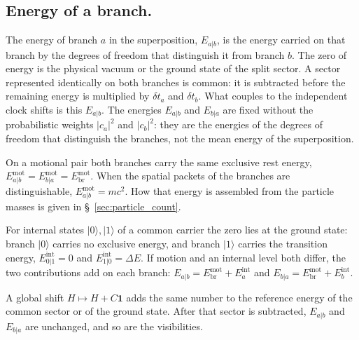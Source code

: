 \documentclass[11pt,a4paper]{article}
\begin{document}
\subsection{Energy of a branch.}
\label{sec:branch_energy}
The energy of branch $a$ in the superposition, $E_{a|b}$, is the energy carried on that branch by the degrees of freedom that distinguish it from branch $b$. The zero of energy is the physical vacuum or the ground state of the split sector. A sector represented identically on both branches is common: it is subtracted before the remaining energy is multiplied by $\delta t_a$ and $\delta t_b$. What couples to the independent clock shifts is this $E_{a|b}$. The energies $E_{a|b}$ and $E_{b|a}$ are fixed without the probabilistic weights $|c_a|^2$ and $|c_b|^2$: they are the energies of the degrees of freedom that distinguish the branches, not the mean energy of the superposition.

On a motional pair both branches carry the same exclusive rest energy, $E_{a|b}^{\mathrm{mot}}=E_{b|a}^{\mathrm{mot}}=E_{\mathrm{br}}^{\mathrm{mot}}$. When the spatial packets of the branches are distinguishable, $E_{a|b}^{\mathrm{mot}}=mc^2$. How that energy is assembled from the particle masses is given in \S~\ref{sec:particle_count}.

For internal states $|0\rangle,|1\rangle$ of a common carrier the zero lies at the ground state: branch $|0\rangle$ carries no exclusive energy, and branch $|1\rangle$ carries the transition energy, $E_{0|1}^{\mathrm{int}}=0$ and $E_{1|0}^{\mathrm{int}}=\Delta E$. If motion and an internal level both differ, the two contributions add on each branch: $E_{a|b}=E_{\mathrm{br}}^{\mathrm{mot}}+E_a^{\mathrm{int}}$ and $E_{b|a}=E_{\mathrm{br}}^{\mathrm{mot}}+E_b^{\mathrm{int}}$.

A global shift $H\mapsto H+C\mathbf 1$ adds the same number to the reference energy of the common sector or of the ground state. After that sector is subtracted, $E_{a|b}$ and $E_{b|a}$ are unchanged, and so are the visibilities.
\end{document}
